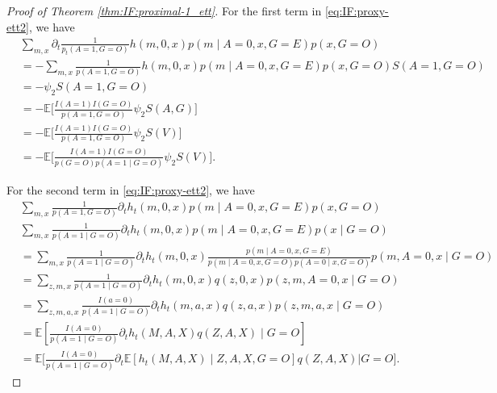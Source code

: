 \documentclass[10pt]{article}
\newcommand{\E}{\mathbb{E}}
\begin{document}
\begin{proof}[Proof of Theorem \ref{thm:IF:proximal-1_ett}]
For the first term in \eqref{eq:IF:proxy-ett2}, we have
\begin{equation}
\label{eq:IF:proxy-ett2-1}
\begin{aligned}
    &\sum_{m,x} \partial_t\frac{1}{p_t(A=1, G=O)}h(m,0,x)p(m\mid A=0,x,G=E)p(x, G=O)\\
    &=-\sum_{m,x} \frac{1}{p(A=1,G=O)}h(m,0,x)p(m\mid A=0,x,G=E)p(x, G=O)S(A=1, G=O)\\
    &=-\psi_2S(A=1,G=O)\\
    &=-\E\Big[\frac{I(A=1)I(G=O)}{p(A=1,G=O)}\psi_2S(A,G)\Big]\\
    &=-\E\Big[\frac{I(A=1)I(G=O)}{p(A=1,G=O)}\psi_2S(V)\Big]\\
    &=-\E\Big[\frac{I(A=1)I(G=O)}{p(G=O)p(A=1\mid G=O)}\psi_2S(V)\Big].
\end{aligned}
\end{equation}

For the second term in \eqref{eq:IF:proxy-ett2}, we have
\begin{align*}
&\sum_{m,x} \frac{1}{p(A=1,G=O)}\partial_t h_t(m,0,x)p(m\mid A=0,x,G=E)p(x,G=O) \\
&\sum_{m,x} \frac{1}{p(A=1\mid G=O)}\partial_t h_t(m,0,x)p(m\mid A=0,x,G=E)p(x\mid G=O) \\
&=\sum_{m,x} \frac{1}{p(A=1\mid G=O)}\partial_t h_t(m,0,x)\frac{p(m\mid A=0,x,G=E)}{p(m\mid A=0,x,G=O)p(A=0\mid x,G=O)}p(m,A=0,x\mid G=O)\\
&=\sum_{z,m,x} \frac{1}{p(A=1\mid G=O)}\partial_t h_t(m,0,x)q(z,0,x)p(z,m,A=0,x\mid G=O)\\
&=\sum_{z,m,a,x}\frac{I(a=0)}{p(A=1\mid G=O)} \partial_t h_t(m,a,x)q(z,a,x)p(z,m,a,x\mid G=O)\\
&=\E[ \frac{I(A=0)}{p(A=1\mid G=O)}\partial_t h_t(M,A,X)q(Z,A,X)\mid G=O]\\
&=\E\Big[ \frac{I(A=0)}{p(A=1\mid G=O)}\partial_t \E[h_t(M,A,X)\mid Z,A,X,G=O]q(Z,A,X)\Big| G=O\Big].
\end{align*}


\end{proof}
\end{document}
